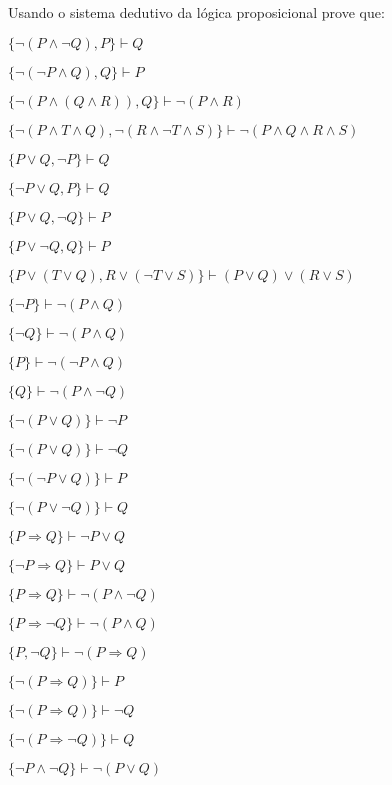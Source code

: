 \begin{questao}\label{test:LPro3}
  Usando o sistema dedutivo da lógica proposicional prove que:
\end{questao}
\begin{exerList}
  \item $\{\neg (P \land \neg Q), P\} \vdash Q$
  \item $\{\neg (\neg P \land Q), Q\} \vdash P$
  \item $\{\neg (P \land (Q \land R)), Q\} \vdash \neg (P \land R)$
  \item $\{\neg (P \land T \land Q), \neg (R \land \neg T \land S)\} \vdash \neg (P \land Q \land R \land S)$
  \item $\{P \lor Q, \neg P\} \vdash Q$
  \item $\{\neg P \lor Q, P\} \vdash Q$
  \item $\{P \lor Q, \neg Q\} \vdash P$
  \item $\{P \lor \neg Q, Q\} \vdash P$
  \item $\{P \lor (T \lor Q), R \lor (\neg T \lor S)\} \vdash (P \lor Q) \lor (R \lor S)$
  \item $\{\neg P\} \vdash \neg (P \land Q)$
  \item $\{\neg Q\} \vdash \neg (P \land Q)$
  \item $\{P\} \vdash \neg (\neg P \land Q)$
  \item $\{Q\} \vdash \neg (P \land \neg Q)$
  \item $\{\neg (P \lor Q)\} \vdash \neg P$
  \item $\{\neg (P \lor Q)\} \vdash \neg Q$
  \item $\{\neg (\neg P \lor Q)\} \vdash P$
  \item $\{\neg (P \lor \neg Q)\} \vdash Q$
  \item $\{P \Rightarrow Q\} \vdash \neg P \lor Q$
  \item $\{\neg P \Rightarrow Q\} \vdash P \lor Q$
  \item $\{P \Rightarrow Q\} \vdash \neg (P \land \neg Q)$
  \item $\{P \Rightarrow \neg Q\} \vdash \neg (P \land Q)$
  \item $\{P, \neg Q\} \vdash \neg (P \Rightarrow Q)$
  \item $\{\neg (P \Rightarrow Q)\} \vdash P$
  \item $\{\neg (P \Rightarrow Q)\} \vdash \neg Q$
  \item $\{\neg (P \Rightarrow \neg Q)\} \vdash Q$
  \item $\{\neg P \land \neg Q\} \vdash \neg (P \lor Q)$
\end{exerList}

